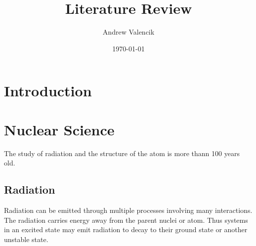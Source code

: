 \documentclass[12pt]{article}
\begin{document}
\title{Literature Review}

\author{Andrew Valencik}

\date{\today}

\maketitle

\tableofcontents


\begin{doublespacing}

\pagebreak
\section{Introduction}




\pagebreak
\section{Nuclear Science}
The study of radiation and the structure of the atom is more thann 100 years old.

\subsection{Radiation}
Radiation can be emitted through multiple processes involving many interactions. The radiation carries energy away from the parent nuclei or atom. Thus systems in an excited state may emit radiation to decay to their ground state or another unstable state. 


\end{doublespacing}
\end{document}

